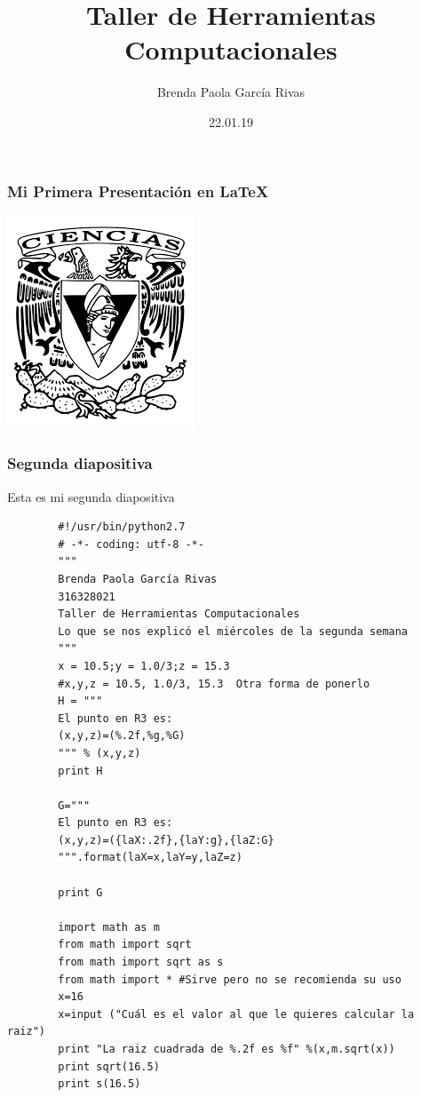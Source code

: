 \documentclass{beamer}
\title{Taller de Herramientas Computacionales}
\author{Brenda Paola García Rivas}
\date{22.01.19}
\begin{document}
	\maketitle
	
\begin{frame}
\transblindshorizontal
	\frametitle{Mi Primera Presentación en LaTeX}
	\includegraphics[scale=0.50]{1.png}
\end{frame}

\begin{frame}
	\frametitle{Segunda diapositiva}
	Esta es mi segunda diapositiva
\end{frame}
\begin{frame}[fragile]
	\begin{verbatim}
		#!/usr/bin/python2.7    
		# -*- coding: utf-8 -*-
		"""
		Brenda Paola García Rivas
		316328021
		Taller de Herramientas Computacionales
		Lo que se nos explicó el miércoles de la segunda semana
		"""
		x = 10.5;y = 1.0/3;z = 15.3
		#x,y,z = 10.5, 1.0/3, 15.3  Otra forma de ponerlo 
		H = """
		El punto en R3 es:
		(x,y,z)=(%.2f,%g,%G)
		""" % (x,y,z)
		print H
		
		G="""
		El punto en R3 es:
		(x,y,z)=({laX:.2f},{laY:g},{laZ:G}
		""".format(laX=x,laY=y,laZ=z)
		
		print G
		
		import math as m
		from math import sqrt
		from math import sqrt as s
		from math import * #Sirve pero no se recomienda su uso
		x=16
		x=input ("Cuál es el valor al que le quieres calcular la raiz")
		print "La raiz cuadrada de %.2f es %f" %(x,m.sqrt(x))
		print sqrt(16.5)
		print s(16.5)
	\end{verbatim}	
\end{frame}
\end{document}

